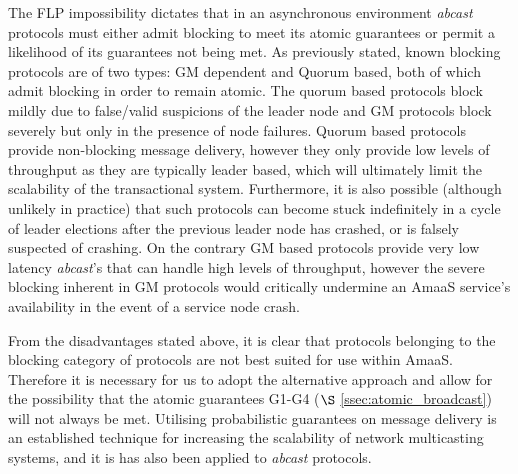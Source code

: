     The FLP impossibility\citep{Fischer:1985:IDC:3149.214121} dictates that in an asynchronous environment \emph{abcast} protocols must either admit blocking to meet its atomic guarantees or permit a likelihood of its guarantees not being met.  As  previously stated, known blocking protocols are of two types: GM dependent and Quorum based, both of which admit blocking in order to remain atomic.  The quorum based protocols block mildly due to false/valid suspicions of the leader node and GM protocols block severely but only in the presence of node failures.  Quorum based protocols provide non-blocking message delivery, however they only provide low levels of throughput as they are typically leader based, which will ultimately limit the scalability of the transactional system.  Furthermore, it is also possible (although unlikely in practice) that such protocols can become stuck indefinitely in a cycle of leader elections after the previous leader node has crashed, or is falsely suspected of crashing.    On the contrary GM based protocols provide very low latency \emph{abcast}'s that can handle high levels of throughput, however the severe blocking inherent in GM protocols would critically undermine an \textsf{AmaaS} service's availability in the event of a service node crash.  
    
    From the disadvantages stated above, it is clear that protocols belonging to the blocking category of protocols are not best suited for use within \textsf{AmaaS}.  Therefore it is necessary for us to adopt the alternative approach and allow for the possibility that the atomic guarantees G1-G4 ($\S$ \ref{ssec:atomic_broadcast}) will not always be met.  Utilising probabilistic guarantees on message delivery is an established technique for increasing the scalability of network multicasting systems\citep{Kermarrec:2003:PRD:766617.766623}, and it is has also been applied to \emph{abcast} protocols.  
    
